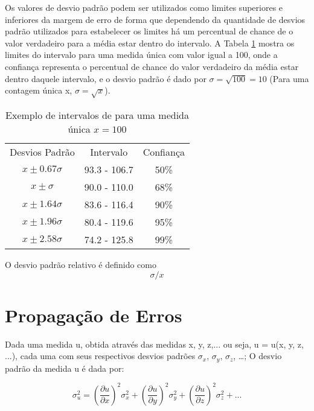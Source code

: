 \documentclass[11pt,a4paper]{article}
\begin{document}
		
		 

		Os valores de desvio padrão podem ser utilizados como limites superiores e inferiores da margem de erro de forma que dependendo da quantidade de desvios padrão utilizados para estabelecer os limites há um percentual de chance de o valor verdadeiro para a média estar dentro do intervalo. A Tabela \ref{tab:medidasContagem} mostra os limites do intervalo para uma medida única com valor igual a 100, onde a confiança representa o percentual de chance do valor verdadeiro da média estar dentro daquele intervalo, e o desvio padrão é dado por $\sigma = \sqrt{100} = 10$ (Para uma contagem única x, $\sigma = \sqrt{x}$).


		\begin{table}[h]
			\centering
			\caption{Exemplo de intervalos de para uma medida única $x=100$}
			\label{tab:medidasContagem}
			\begin{tabular}{c c c}
				\hline
				\addlinespace[6pt]
				Desvios Padrão & Intervalo & Confiança \\
				\addlinespace[6pt]
				\hline
				$x \pm 0.67 \sigma$ & 93.3 - 106.7 & 50\% \\
				\addlinespace[6pt]
				$x \pm \sigma$ & 90.0 - 110.0 & 68\% \\
				\addlinespace[6pt]
				$x \pm 1.64 \sigma$ & 83.6 - 116.4 & 90\% \\
				\addlinespace[6pt]
				$x \pm 1.96 \sigma$ & 80.4 - 119.6 & 95\% \\
				\addlinespace[6pt]
				$x \pm 2.58 \sigma$ & 74.2 - 125.8 & 99\% \\
				\hline
				\hline
			\end{tabular}
		\end{table}

		O desvio padrão relativo é definido como $$\sigma / x$$

\section{Propagação de Erros}

	Dada uma medida u, obtida através das medidas x, y, z,... ou seja, u = u(x, y, z, ...), cada uma com seus respectivos desvios padrões $\sigma_x$, $\sigma_y$, $\sigma_z$, \dots; O desvio padrão da medida u é dada por:
	
		\begin{equation}
			\sigma_u^2 = \left(\frac{\partial u}{\partial x}\right)^2 \sigma_x^2
				+ \left(\frac{\partial u}{\partial y}\right)^2 \sigma_y^2
				+ \left(\frac{\partial u}{\partial z}\right)^2 \sigma_z^2 + ...
		\end{equation}
\end{document}
